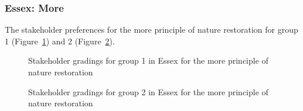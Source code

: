 \documentclass[
  12pt,
  letterpaper,
  DIV=11,
  numbers=noendperiod]{scrartcl}
\begin{document}
\newpage{}

\subsubsection{Essex: More}\label{essex-more}

The stakeholder preferences for the more principle of nature restoration
for group 1 (Figure~\ref{fig-EsMoreG1}) and 2
(Figure~\ref{fig-EsMoreG2}).

\begin{figure}[H]


\caption{\label{fig-EsMoreG1}Stakeholder gradings for group 1 in Essex
for the more principle of nature restoration}

\end{figure}%

\begin{figure}[H]


\caption{\label{fig-EsMoreG2}Stakeholder gradings for group 2 in Essex
for the more principle of nature restoration}

\end{figure}%
\end{document}
